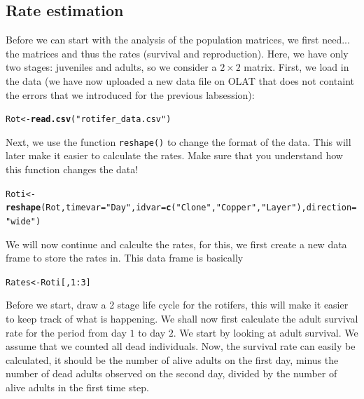 \documentclass{article}\usepackage[]{graphicx}\usepackage[]{color}
\makeatletter
\newcommand{\hlnum}[1]{\textcolor[rgb]{0.686,0.059,0.569}{#1}}%
\newcommand{\hlstr}[1]{\textcolor[rgb]{0.192,0.494,0.8}{#1}}%
\newcommand{\hlopt}[1]{\textcolor[rgb]{0,0,0}{#1}}%
\newcommand{\hlstd}[1]{\textcolor[rgb]{0.345,0.345,0.345}{#1}}%
\newcommand{\hlkwb}[1]{\textcolor[rgb]{0.69,0.353,0.396}{#1}}%
\newcommand{\hlkwc}[1]{\textcolor[rgb]{0.333,0.667,0.333}{#1}}%
\newcommand{\hlkwd}[1]{\textcolor[rgb]{0.737,0.353,0.396}{\textbf{#1}}}%
\newenvironment{kframe}{%
 \def\at@end@of@kframe{}%
 \ifinner\ifhmode%
  \def\at@end@of@kframe{\end{minipage}}%
  \begin{minipage}{\columnwidth}%
 \fi\fi%
 \def\FrameCommand##1{\hskip\@totalleftmargin \hskip-\fboxsep
 \colorbox{shadecolor}{##1}\hskip-\fboxsep
     \hskip-\linewidth \hskip-\@totalleftmargin \hskip\columnwidth}%
 \MakeFramed {\advance\hsize-\width
   \@totalleftmargin\z@ \linewidth\hsize
   \@setminipage}}%
 {\par\unskip\endMakeFramed%
 \at@end@of@kframe}
\newenvironment{knitrout}{}{} %
\makeatother
\begin{document}
\subsection{Rate estimation}
Before we can start with the analysis of the population matrices, we first need... the matrices and thus the rates (survival and reproduction). Here, we have only two stages: juveniles and adults, so we consider a $2\times 2$ matrix. First, we load in the data (we have now uploaded a new data file on OLAT that does not containt the errors that we introduced for the previous labsession):
\begin{knitrout}
\color{fgcolor}\begin{kframe}
\begin{alltt}
\hlstd{Rot} \hlkwb{<-} \hlkwd{read.csv}\hlstd{(}\hlstr{"rotifer_data.csv"}\hlstd{)}
\end{alltt}
\end{kframe}
\end{knitrout}
Next, we use the function \texttt{reshape()} to change the format of the data. This will later make it easier to calculate the rates. Make sure that you understand how this function changes the data!
\begin{knitrout}
\color{fgcolor}\begin{kframe}
\begin{alltt}
\hlstd{Roti}\hlkwb{<-}\hlkwd{reshape}\hlstd{(Rot,}\hlkwc{timevar}\hlstd{=}\hlstr{"Day"}\hlstd{,}\hlkwc{idvar}\hlstd{=}\hlkwd{c}\hlstd{(}\hlstr{"Clone"}\hlstd{,}\hlstr{"Copper"}\hlstd{,}\hlstr{"Layer"}\hlstd{),}\hlkwc{direction}\hlstd{=}\hlstr{"wide"}\hlstd{)}
\end{alltt}
\end{kframe}
\end{knitrout}
We will now continue and calculte the rates, for this, we first create a new data frame to store the rates in. This data frame is basically 
\begin{knitrout}
\color{fgcolor}\begin{kframe}
\begin{alltt}
\hlstd{Rates} \hlkwb{<-} \hlstd{Roti[,}\hlnum{1}\hlopt{:}\hlnum{3}\hlstd{]}
\end{alltt}
\end{kframe}
\end{knitrout}
Before we start, draw a 2 stage life cycle for the rotifers, this will make it easier to keep track of what is happening. We shall now first calculate the adult survival rate for the period from day $1$ to day $2$. We start by looking at adult survival. We assume that we counted all dead individuals. Now, the survival rate can easily be calculated, it should be the number of alive adults on the first day, minus the number of dead adults observed on the second day, divided by the number of alive adults in the first time step.
\end{document}
